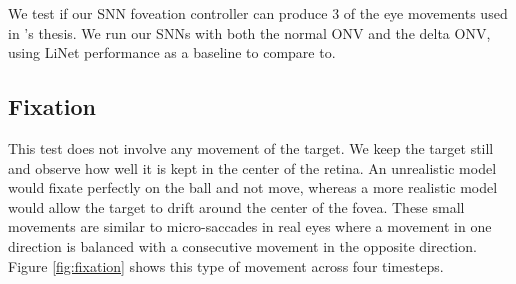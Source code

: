 \documentclass[../taasin.tex]{subfiles}
\begin{document}
We test if our SNN foveation controller can produce 3 of the eye movements used in \cite{Arjun}'s thesis. We run our SNNs with both the normal ONV and the delta ONV, using LiNet performance as a baseline to compare to.


\subsection{Fixation}

This test does not involve any movement of the target. We keep the target still and observe how well it is kept in the center of the retina. An unrealistic model would fixate perfectly on the ball and not move, whereas a more realistic model would allow the target to drift around the center of the fovea. These small movements are similar to micro-saccades in real eyes where a movement in one direction is balanced with a consecutive movement in the opposite direction. Figure \ref{fig:fixation}  shows this type of movement across four timesteps.

\end{document}
